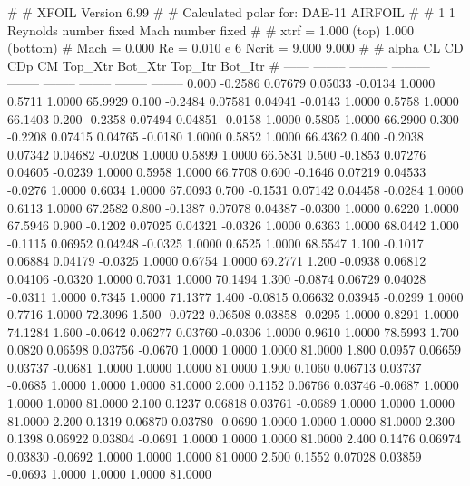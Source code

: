#  
#       XFOIL         Version 6.99
#  
# Calculated polar for: DAE-11 AIRFOIL                                  
#  
# 1 1 Reynolds number fixed          Mach number fixed         
#  
# xtrf =   1.000 (top)        1.000 (bottom)  
# Mach =   0.000     Re =     0.010 e 6     Ncrit =   9.000  9.000
#  
#   alpha    CL        CD       CDp       CM     Top_Xtr  Bot_Xtr  Top_Itr  Bot_Itr
#  ------ -------- --------- --------- -------- -------- -------- -------- --------
   0.000  -0.2586   0.07679   0.05033  -0.0134   1.0000   0.5711   1.0000  65.9929
   0.100  -0.2484   0.07581   0.04941  -0.0143   1.0000   0.5758   1.0000  66.1403
   0.200  -0.2358   0.07494   0.04851  -0.0158   1.0000   0.5805   1.0000  66.2900
   0.300  -0.2208   0.07415   0.04765  -0.0180   1.0000   0.5852   1.0000  66.4362
   0.400  -0.2038   0.07342   0.04682  -0.0208   1.0000   0.5899   1.0000  66.5831
   0.500  -0.1853   0.07276   0.04605  -0.0239   1.0000   0.5958   1.0000  66.7708
   0.600  -0.1646   0.07219   0.04533  -0.0276   1.0000   0.6034   1.0000  67.0093
   0.700  -0.1531   0.07142   0.04458  -0.0284   1.0000   0.6113   1.0000  67.2582
   0.800  -0.1387   0.07078   0.04387  -0.0300   1.0000   0.6220   1.0000  67.5946
   0.900  -0.1202   0.07025   0.04321  -0.0326   1.0000   0.6363   1.0000  68.0442
   1.000  -0.1115   0.06952   0.04248  -0.0325   1.0000   0.6525   1.0000  68.5547
   1.100  -0.1017   0.06884   0.04179  -0.0325   1.0000   0.6754   1.0000  69.2771
   1.200  -0.0938   0.06812   0.04106  -0.0320   1.0000   0.7031   1.0000  70.1494
   1.300  -0.0874   0.06729   0.04028  -0.0311   1.0000   0.7345   1.0000  71.1377
   1.400  -0.0815   0.06632   0.03945  -0.0299   1.0000   0.7716   1.0000  72.3096
   1.500  -0.0722   0.06508   0.03858  -0.0295   1.0000   0.8291   1.0000  74.1284
   1.600  -0.0642   0.06277   0.03760  -0.0306   1.0000   0.9610   1.0000  78.5993
   1.700   0.0820   0.06598   0.03756  -0.0670   1.0000   1.0000   1.0000  81.0000
   1.800   0.0957   0.06659   0.03737  -0.0681   1.0000   1.0000   1.0000  81.0000
   1.900   0.1060   0.06713   0.03737  -0.0685   1.0000   1.0000   1.0000  81.0000
   2.000   0.1152   0.06766   0.03746  -0.0687   1.0000   1.0000   1.0000  81.0000
   2.100   0.1237   0.06818   0.03761  -0.0689   1.0000   1.0000   1.0000  81.0000
   2.200   0.1319   0.06870   0.03780  -0.0690   1.0000   1.0000   1.0000  81.0000
   2.300   0.1398   0.06922   0.03804  -0.0691   1.0000   1.0000   1.0000  81.0000
   2.400   0.1476   0.06974   0.03830  -0.0692   1.0000   1.0000   1.0000  81.0000
   2.500   0.1552   0.07028   0.03859  -0.0693   1.0000   1.0000   1.0000  81.0000
